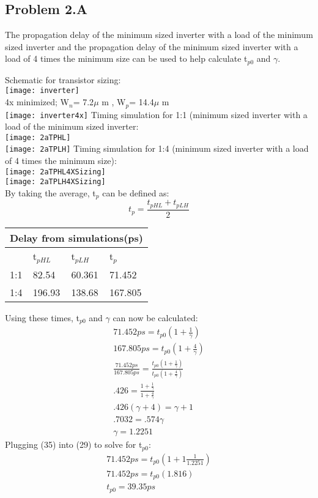 \documentclass{article}
\begin{document}
  \subsection{Problem 2.A}
   The propagation delay of the minimum sized inverter with a load of the minimum sized inverter and the propagation delay of the minimum sized inverter with a load of 4 times the minimum size can be used to help calculate t$_{p0}$ and $\gamma$.
   \par
   Schematic for transistor sizing:\\
   \texttt{[image: inverter]}\\
   4x minimized; W$_{n}$= 7.2$\mu$ m , W$_{p}$= 14.4$\mu$ m\\
   \texttt{[image: inverter4x]}
   \newpage
  Timing simulation for 1:1 (minimum sized inverter with a load of the minimum sized inverter:\\
   \texttt{[image: 2aTPHL]}\\
   \texttt{[image: 2aTPLH]}
   \newpage
   Timing simulation for 1:4 (minimum sized inverter with a load of 4 times the minimum size):\\
   \texttt{[image: 2aTPHL4XSizing]}\\
   \texttt{[image: 2aTPLH4XSizing]}\\
   By taking the average, t$_{p}$ can be defined as:
\begin{displaymath}
t_{p}= \frac{t_{pHL}+t_{pLH}}{2}
\end{displaymath} 
\begin{center}  
	\begin{tabular}{|p{2cm}||p{2cm}|p{2cm}|p{2cm}|}
 	\hline
 	\multicolumn{4}{|c|}{Delay from simulations(ps)} \\
 		\hline
  		&t$_{pHL}$ & t$_{pLH}$ & t$_{p}$\\
 		\hline   
 		1:1 & 82.54 &60.361& 71.452 \\
	 	1:4 & 196.93 &138.68&167.805 \\
 		\hline
 	\end{tabular}
\end{center}
\newpage
Using these times, t$_{p0}$ and $\gamma$ can now be calculated:
\begin{gather}
71.452ps=t_{p0}(1+ \frac{1}{\gamma})\\
167.805ps=t_{p0}(1+\frac{4}{\gamma})\\
\frac{71.452ps}{167.805ps} =\frac{t_{p0}(1+\frac{1}{\gamma})}{t_{p0}(1+\frac{4}{\gamma})}\\
.426=\frac{1+\frac{1}{\gamma}}{1+\frac{4}{\gamma}}\\
.426(\gamma +4)= \gamma + 1\\
.7032=.574\gamma \\
\gamma=1.2251
\end{gather}
Plugging (35) into (29) to solve for t$_{p0}$:
	\begin{gather}
	71.452ps=t_{p0}(1+1 \frac{1}{1.2251})\\
	71.452ps=t_{p0}(1.816)\\
	t_{p0}=39.35ps
	\end{gather}
	\newpage
\end{document}
